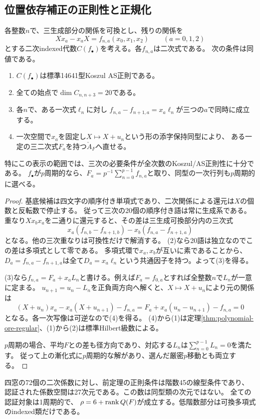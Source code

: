 \subsection{位置依存補正の正則性と正規化}
\begin{theorem}[可換Ore四窓の線型AS判定]\label{thm:indexed-polynomial-ore}
各整数$n$で、三生成部分の関係を可換とし、残りの関係を
\[
 Xx_a-x_aX=f_{n,a}(x_0,x_1,x_2)\qquad(a=0,1,2)
\]
とする二次indexed代数$C(f_\bullet)$を考える。各$f_{n,a}$は二次式である。
次の条件は同値である。
\begin{enumerate}
\item $C(f_\bullet)$は標準14641型Koszul AS正則である。
\item 全ての始点で$\dim C_{n,n+3}=20$である。
\item 各$n$で、ある一次式$\ell_n$に対し
$f_{n,a}-f_{n+1,a}=x_a\ell_n$が三つの$a$で同時に成立する。
\item 一次空間で$x_a$を固定し$X\mapsto X+u_n$という形の添字保持同型により、
ある一定の三二次式$F_a$を持つ$\check A_F$へ直せる。
\end{enumerate}
特にこの表示の範囲では、三次の必要条件が全次数のKoszul/AS正則性に十分である。
$f_\bullet$が$p$周期的なら、$F_a=p^{-1}\sum_{n=0}^{p-1}f_{n,a}$と取り、同型の一次行列も$p$周期的に選べる。
\end{theorem}
\begin{proof}
基底候補は四文字の順序付き単項式であり、二次関係による還元は$X$の個数と反転数で停止する。
従って三次の20個の順序付き語は常に生成系である。
重なり$Xx_bx_a$を二通りに還元すると、その差は三生成可換部分内の三次式
\[
 x_a(f_{n,b}-f_{n+1,b})-x_b(f_{n,a}-f_{n+1,a})
\]
となる。他の三次重なりは可換性だけで解消する。
(2)なら20語は独立なのでこの差は多項式として零である。
多項式環で$x_a,x_b$が互いに素であることから、
$D_a=f_{n,a}-f_{n+1,a}$は全て$D_a=x_a\ell_n$という共通因子を持つ。よって(3)を得る。

(3)なら$f_{n,a}=F_a+x_a L_n$と書ける。例えば$F_a=f_{0,a}$とすれば全整数$n$で$L_n$が一意に定まる。
$u_{n+1}=u_n-L_n$を正負両方向へ解くと、$X\mapsto X+u_n$により元の関係は
\[
 (X+u_n)x_a-x_a(X+u_{n+1})-f_{n,a}
 =F_a+x_a(u_n-u_{n+1})-f_{n,a}=0
\]
となる。各一次写像は可逆なので(4)を得る。
(4)から(1)は定理\ref{thm:polynomial-ore-regular}、(1)から(2)は標準Hilbert級数による。

$p$周期の場合、平均$F$との差も径方向であり、対応する$L_n$は$\sum_{n=0}^{p-1}L_n=0$を満たす。
従って上の漸化式に$p$周期的な解があり、選んだ厳密$p$移動とも両立する。
\end{proof}
\begin{corollary}[四窓の認証部分と低階数の除外]\label{cor:indexed-polynomial-ore-four}
四窓の72個の二次係数に対し、前定理の正則条件は階数45の線型条件であり、
認証された係数空間は27次元である。この数は同型類の次元ではない。
全ての認証対象は1周期的で、
$\rho=6+\operatorname{rank} Q(F)$が成立する。低階数部分は可換多項式のindexed類だけである。
\end{corollary}

